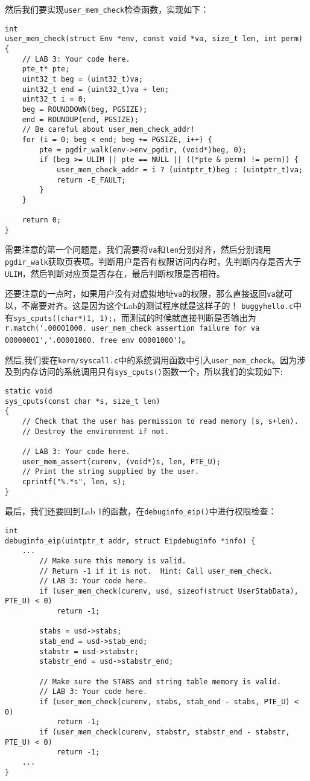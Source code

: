 \documentclass[11pt]{article}
\begin{document}
然后我们要实现\lstinline|user_mem_check|检查函数，实现如下：
\begin{lstlisting}[title=kern/pmap.c]
int
user_mem_check(struct Env *env, const void *va, size_t len, int perm)
{
	// LAB 3: Your code here.
	pte_t* pte;
	uint32_t beg = (uint32_t)va;
	uint32_t end = (uint32_t)va + len;
	uint32_t i = 0;
	beg = ROUNDDOWN(beg, PGSIZE);
	end = ROUNDUP(end, PGSIZE);
	// Be careful about user_mem_check_addr!
	for (i = 0; beg < end; beg += PGSIZE, i++) {
		pte = pgdir_walk(env->env_pgdir, (void*)beg, 0);
		if (beg >= ULIM || pte == NULL || ((*pte & perm) != perm)) {
			user_mem_check_addr = i ? (uintptr_t)beg : (uintptr_t)va;
			return -E_FAULT;
		}
	}

	return 0;
}
\end{lstlisting}
需要注意的第一个问题是，我们需要将\lstinline|va|和\lstinline|len|分别对齐，然后分别调用\lstinline|pgdir_walk|获取页表项。判断用户是否有权限访问内存时，先判断内存是否大于\lstinline|ULIM|，然后判断对应页是否存在，最后判断权限是否相符。

还要注意的一点时，如果用户没有对虚拟地址\lstinline|va|的权限，那么直接返回\lstinline|va|就可以，不需要对齐。这是因为这个Lab的测试程序就是这样子的！
\lstinline|buggyhello.c|中有\lstinline|sys_cputs((char*)1, 1);|，而测试的时候就直接判断是否输出为\lstinline|r.match('.00001000. user_mem_check assertion failure for va 00000001','.00001000. free env 00001000')|。

然后,我们要在\lstinline|kern/syscall.c|中的系统调用函数中引入\lstinline|user_mem_check|。因为涉及到内存访问的系统调用只有\lstinline|sys_cputs()|函数一个，所以我们的实现如下:
\begin{lstlisting}[title=kern/syscall.c]
static void
sys_cputs(const char *s, size_t len)
{
	// Check that the user has permission to read memory [s, s+len).
	// Destroy the environment if not.

	// LAB 3: Your code here.
	user_mem_assert(curenv, (void*)s, len, PTE_U);
	// Print the string supplied by the user.
	cprintf("%.*s", len, s);
}
\end{lstlisting}

最后，我们还要回到Lab 1的函数，在\lstinline|debuginfo_eip()|中进行权限检查：
\begin{lstlisting}[title=kern/kdebug.c]
int
debuginfo_eip(uintptr_t addr, struct Eipdebuginfo *info) {
	...
		// Make sure this memory is valid.
		// Return -1 if it is not.  Hint: Call user_mem_check.
		// LAB 3: Your code here.
		if (user_mem_check(curenv, usd, sizeof(struct UserStabData), PTE_U) < 0)
			return -1;

		stabs = usd->stabs;
		stab_end = usd->stab_end;
		stabstr = usd->stabstr;
		stabstr_end = usd->stabstr_end;

		// Make sure the STABS and string table memory is valid.
		// LAB 3: Your code here.
		if (user_mem_check(curenv, stabs, stab_end - stabs, PTE_U) < 0)
			return -1;
		if (user_mem_check(curenv, stabstr, stabstr_end - stabstr, PTE_U) < 0)
			return -1;
	...
}
\end{lstlisting}
\end{document}
